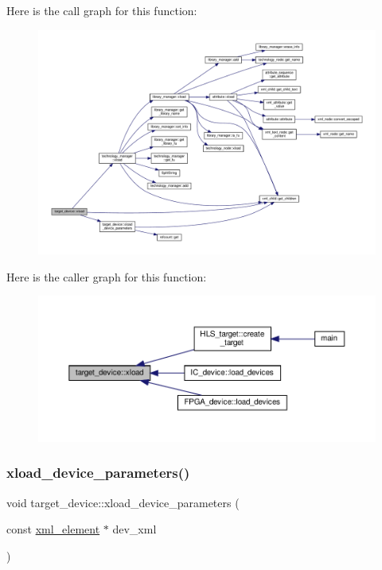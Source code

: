 Here is the call graph for this function\+:
\nopagebreak
\begin{figure}[H]
\begin{center}
\leavevmode
\includegraphics[width=350pt]{d9/dd8/classtarget__device_a1a2a15130520d7298b0633cbd81757ac_cgraph}
\end{center}
\end{figure}
Here is the caller graph for this function\+:
\nopagebreak
\begin{figure}[H]
\begin{center}
\leavevmode
\includegraphics[width=350pt]{d9/dd8/classtarget__device_a1a2a15130520d7298b0633cbd81757ac_icgraph}
\end{center}
\end{figure}
\mbox{\label{classtarget__device_ad6cfdaa73e795c5c7901c482ead7d5e7}} 
\subsubsection{\texorpdfstring{xload\+\_\+device\+\_\+parameters()}{xload\_device\_parameters()}}
{\footnotesize\ttfamily void target\+\_\+device\+::xload\+\_\+device\+\_\+parameters (\begin{DoxyParamCaption}\item[{const \hyperlink{classxml__element}{xml\+\_\+element} $\ast$}]{dev\+\_\+xml }\end{DoxyParamCaption})\hspace{0.3cm}{\ttfamily [protected]}}



